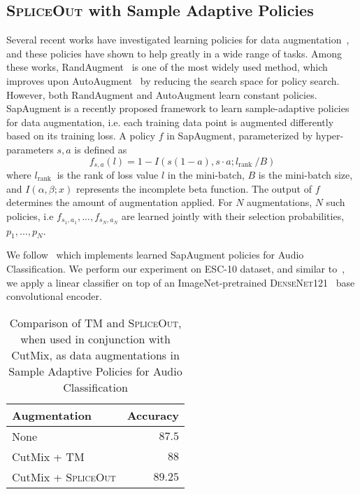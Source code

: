 \documentclass{article}
\newcommand{\SpA}{{\textsc{SpliceOut}}\xspace}
\begin{document}
\subsection{\SpA with Sample Adaptive Policies}
Several recent works have investigated learning policies for data augmentation~\citep{autoaugment,randaugment}, and these policies have shown to help greatly in a wide range of tasks. Among these works, RandAugment~\citep{randaugment} is one of the most widely used method, which improves upon AutoAugment~\citep{autoaugment} by reducing the search space for policy search. However, both RandAugment and AutoAugment learn constant policies. SapAugment is a recently proposed framework to learn sample-adaptive policies for data augmentation, i.e. each training data point is augmented differently based on its training loss. A policy $f$ in SapAugment, parameterized by hyper-parameters $s, a$ is defined as 
%
$$
f_{s, a}(l)=1-I\left(s(1-a), s \cdot a ; l_{\text {rank }} / B\right)
$$
where $l_{\text {rank }}$ is the rank of loss value $l$ in the mini-batch, $B$ is the mini-batch size, and $I(\alpha, \beta ; x)$ represents the incomplete beta function. The output of $f$ determines the amount of augmentation applied. For $N$ augmentations, $N$ such policies, i.e $f_{s_1, a_1}, ..., f_{s_N, a_N}$ are learned jointly with their selection probabilities, $p_1, ..., p_N$. 

We follow~\citep{deepspectrumlite} which implements learned SapAugment  policies for Audio Classification. We perform our experiment on ESC-10 dataset, and similar to~\citep{deepspectrumlite}, we apply a linear classifier on top of an ImageNet-pretrained \textsc{DenseNet}121~\citep{huang2017densely} base convolutional encoder.

\begin{table}[h]
    \centering
    \caption{Comparison of TM and \SpA, when used in conjunction with CutMix, as data augmentations in Sample Adaptive Policies for Audio Classification}
    \begin{tabular}{lr}
    \toprule
    Augmentation & Accuracy\\
    \midrule
    None & $87.5$\\
    CutMix + TM~\citep{deepspectrumlite}&  $88$\\
    CutMix + \SpA & $\mathbf{89.25}$\\
    \bottomrule
    \end{tabular}
    \label{tab:sapaug}
\end{table}
\end{document}
